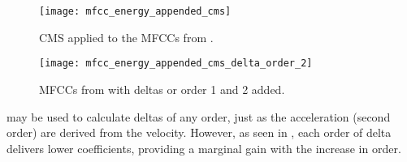 \begin{figure}[ht]
    \centering
    \texttt{[image: mfcc\_energy\_appended\_cms]}
    \caption{CMS applied to the MFCCs from .}
    \label{fig:mfcc_energy_appended_cms}
\end{figure}

\begin{figure}[ht]
    \centering
    \texttt{[image: mfcc\_energy\_appended\_cms\_delta\_order\_2]}
    \caption{MFCCs from  with deltas or order 1 and 2 added.}
    \label{fig:mfcc_energy_appended_cms_delta_order_2}
\end{figure}

 may be used to calculate deltas of any order, just as the acceleration (second order) are derived from the velocity. However, as seen in , each order of delta delivers lower coefficients, providing a marginal gain with the increase in order.